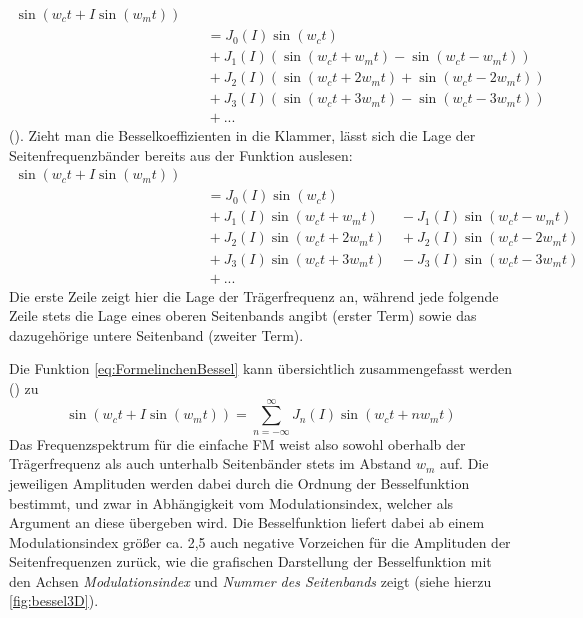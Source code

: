 \begin{equation}
\begin{split}
\sin(w_ct + I\sin(w_mt)) \\ &\quad = J_0(I)\sin(w_ct) \\ &\quad + J_1(I)(\sin(w_ct + w_mt) - \sin(w_ct - w_mt)) \\ &\quad + J_2(I)(\sin(w_ct + 2w_mt)+\sin(w_ct-2w_mt)) \\ &\quad  + J_3(I)(\sin(w_ct + 3w_mt) - \sin(w_ct - 3w_mt)) \\ &\quad  + ...
\end{split}
\end{equation}
(\cite[S.528]{chowningPaper}). Zieht man die Besselkoeffizienten in die Klammer, lässt sich die Lage der Seitenfrequenzbänder bereits aus der Funktion auslesen:
\begin{equation}\label{eq:FormelinchenBessel}
\begin{split}
\sin(w_ct + I\sin(w_mt)) \\ &\quad = J_0(I)\sin(w_ct) \\ &\quad + J_1(I)\sin(w_ct + w_mt) \quad\enspace - J_1(I)\sin(w_ct - w_mt) \\ &\quad + J_2(I)\sin(w_ct + 2w_mt) \quad + J_2(I)\sin(w_ct-2w_mt) \\ &\quad  + J_3(I)\sin(w_ct + 3w_mt) \quad - J_3(I)\sin(w_ct - 3w_mt) \\ &\quad  + ...
\end{split}
\end{equation}
Die erste Zeile zeigt hier die Lage der Trägerfrequenz an, während jede folgende Zeile stets die Lage eines oberen Seitenbands angibt (erster Term) sowie das dazugehörige untere Seitenband (zweiter Term). 

Die Funktion \ref{eq:FormelinchenBessel} kann übersichtlich zusammengefasst werden (\cite{schottstaedtWeb}) zu 
\begin{equation}\label{esq:Besselbabymonster}
\sin(w_ct + I\sin(w_mt)) = \sum_{n=-\infty}^{\infty}J_n(I)\sin(w_ct+nw_mt)
\end{equation}
Das Frequenzspektrum für die einfache FM weist also sowohl oberhalb der Trägerfrequenz als auch unterhalb Seitenbänder stets im Abstand \begin{math} w_m \end{math} auf. Die jeweiligen Amplituden werden dabei durch die Ordnung der Besselfunktion bestimmt, und zwar in Abhängigkeit vom Modulationsindex, welcher als Argument an diese übergeben wird. Die Besselfunktion liefert dabei ab einem Modulationsindex größer ca. 2,5 auch negative Vorzeichen für die Amplituden der Seitenfrequenzen zurück, wie die grafischen Darstellung der Besselfunktion mit den Achsen \textit{Modulationsindex} und \textit{Nummer des Seitenbands} zeigt (siehe hierzu \ref{fig:bessel3D}). 

